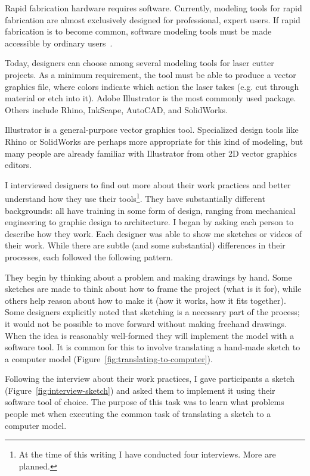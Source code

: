 \documentclass[11pt]{article}
\begin{document}
Rapid fabrication hardware requires software. Currently, modeling
tools for rapid fabrication are almost exclusively designed for
professional, expert users. If rapid fabrication is to become common,
software modeling tools must be made accessible by ordinary
users~\cite{lipson-homefactory}.

Today, designers can choose among several modeling tools for laser
cutter projects. As a minimum requirement, the tool must be able to
produce a vector graphics file, where colors indicate which action the
laser takes (e.g. cut through material or etch into it). Adobe
Illustrator is the most commonly used package. Others include Rhino,
InkScape, AutoCAD, and SolidWorks.

Illustrator is a general-purpose vector graphics tool. Specialized
design tools like Rhino or SolidWorks are perhaps more appropriate for
this kind of modeling, but many people are already familiar with
Illustrator from other 2D vector graphics editors. 

I interviewed designers to find out more about their work practices
and better understand how they use their tools\footnote{At the time of
  this writing I have conducted four interviews. More are
  planned.}. They have substantially different backgrounds: all have
training in some form of design, ranging from mechanical engineering
to graphic design to architecture. I began by asking each person to
describe how they work. Each designer was able to show me sketches or
videos of their work. While there are subtle (and some substantial)
differences in their processes, each followed the following pattern.

They begin by thinking about a problem and making drawings by
hand. Some sketches are made to think about how to frame the project
(what is it for), while others help reason about how to make it (how
it works, how it fits together). Some designers explicitly noted that
sketching is a necessary part of the process; it would not be possible
to move forward without making freehand drawings. When the idea is
reasonably well-formed they will implement the model with a software
tool. It is common for this to involve translating a hand-made sketch
to a computer model (Figure~\ref{fig:translating-to-computer}). 

Following the interview about their work practices, I gave
participants a sketch (Figure~\ref{fig:interview-sketch}) and asked
them to implement it using their software tool of choice. The purpose
of this task was to learn what problems people met when executing the
common task of translating a sketch to a computer model.
\end{document}
